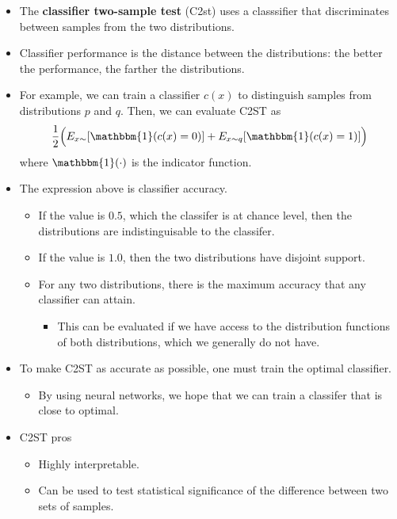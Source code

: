 \documentclass[10pt]{article}
\begin{document}
\begin{itemize}
    \item The {\bf classifier two-sample test} (C2st) uses a classsifier that discriminates between samples from the two distributions.
    
    \item Classifier performance is the distance between the distributions: the better the performance, the farther the distributions.
    
    \item For example, we can train a classifier $c(x)$ to distinguish samples from distributions $p$ and $q$. Then, we can evaluate C2ST as
    \begin{align*}
        \frac{1}{2}\Big( E_{x \sim }[\mathbbm{1}(c(x) = 0)] + E_{x \sim q}[\mathbbm{1}(c(x) = 1)] \Big)
    \end{align*}
    where $\mathbbm{1}(\cdot)$ is the indicator function. 
        
    \item The expression above is classifier accuracy.
    \begin{itemize}
        \item If the value is $0.5$, which the classifer is at chance level, then the distributions are indistinguisable to the classifer.
        
        \item If the value is $1.0$, then the two distributions have disjoint support.
        
        \item For any two distributions, there is the maximum accuracy that any classifier can attain.
        \begin{itemize}
            \item This can be evaluated if we have access to the distribution functions of both distributions, which we generally do not have.
        \end{itemize}            
    \end{itemize}

    \item To make C2ST as accurate as possible, one must train the optimal classifier.
    \begin{itemize}
        \item By using neural networks, we hope that we can train a classifer that is close to optimal.
    \end{itemize}

    \item C2ST pros
    \begin{itemize}
        \item Highly interpretable.
        \item Can be used to test statistical significance of the difference between two sets of samples.
    \end{itemize}


\end{itemize}
\end{document}
